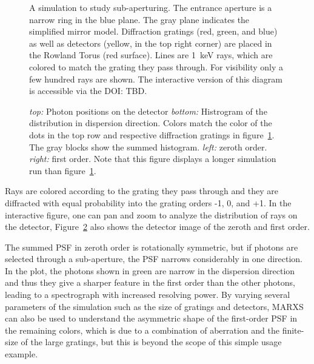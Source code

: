 \documentclass[twocolumn]{aastex61}
\begin{document}
\begin{figure}[ht!]
\caption{A simulation to study sub-aperturing. The entrance aperture is a
  narrow ring in the blue plane. The gray plane indicates the simplified
  mirror model. Diffraction gratings (red, green, and blue) as well as
  detectors (yellow, in the top right corner) are placed in the Rowland Torus
  (red surface). Lines are 1~keV rays, which are colored to match the grating
  they pass through. For visibility only a few hundred rays are shown. The
  interactive version of this diagram is accessible via the DOI: TBD.}
    \label{fig:subaper3d}
\end{figure}


\begin{figure}[ht!]
\caption{\emph{top:} Photon positions on the detector \emph{bottom:} Histrogram
  of the distribution in dispersion direction. Colors match the color of the
  dots in the top row and respective diffraction gratings in
  figure~\ref{fig:subaper3d}. The gray blocks show the summed
  histogram. \emph{left:} zeroth order. \emph{right:} first order. Note that
  this figure displays a longer simulation run than figure~\ref{fig:subaper3d}.}
    \label{fig:subaper}
\end{figure}



Rays are colored according to the grating they pass
through and they are diffracted with equal probability into the grating orders
-1, 0, and +1. In the interactive figure, one can pan and zoom to analyze the
distribution of rays on the detector, Figure~\ref{fig:subaper} also shows the
detector image of the zeroth and first order. 

The summed PSF in zeroth order is rotationally symmetric, but if photons are
selected through a sub-aperture, the PSF narrows considerably in one
direction. In the plot, the photons shown in green are narrow in the dispersion
direction and thus they give a sharper feature in the first order than the
other photons, leading to a spectrograph with increased resolving power. By
varying several parameters of the simulation such as the size of gratings and
detectors, MARXS can also be used to understand the asymmetric shape of the
first-order PSF in the remaining colors, which is due to a combination of
aberration and the finite-size of the large gratings, but this is beyond the
scope of this simple usage example.
\end{document}
